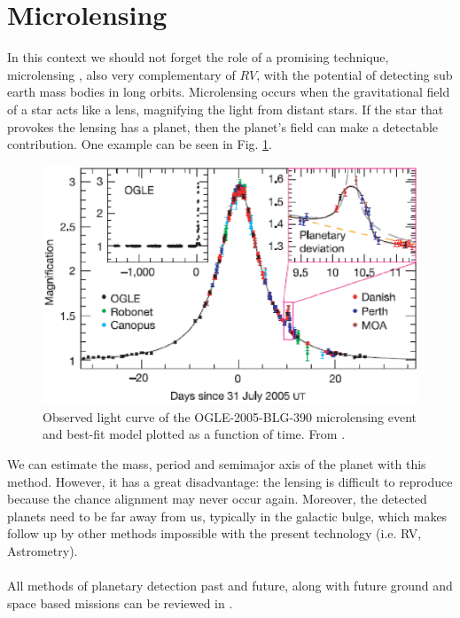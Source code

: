 \documentclass[dvips,12pt,a4paper]{report}
\begin{document}
\section{Microlensing} 
\label{microlens}
\indent In this context we should not forget the role of a promising technique, microlensing \citep{Beaulieu-2006}, also very complementary of $RV$, with the potential of detecting sub earth mass bodies in long orbits. Microlensing occurs when the gravitational field of a star acts like a lens, magnifying the light from distant stars. If the star that provokes the lensing has a planet, then the planet's field can make a detectable contribution. One example can be seen in Fig. \ref{microlensfig}. 
\begin{figure}[h]
\centering
\includegraphics[trim=0cm 0.5cm 0cm 0.5cm,clip,height=5 cm]{pics/microlensing2}
\caption[Example of a microlensing event]{Observed light curve of the OGLE-2005-BLG-390 microlensing event and best-fit model plotted as a function of time. From \citet{Beaulieu-2006}.}
\label{microlensfig}
\end{figure}

We can estimate the mass, period and semimajor axis of the planet with this method. However, it has a great disadvantage: the lensing is difficult to reproduce because the chance alignment may never occur again. Moreover, the detected planets need to be far away from us, typically in the galactic bulge, which makes follow up by other methods impossible with the present technology (i.e. RV, Astrometry).
\\
\\
All methods of planetary detection past and future, along with future ground and space based missions can be reviewed in \citet{Perryman-2005}.



\end{document}
